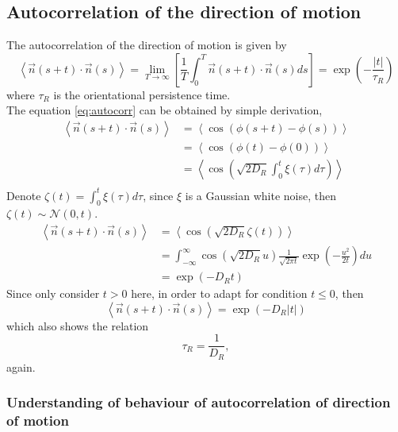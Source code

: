 \documentclass[runningheads]{llncs}
\begin{document}
\subsection{Autocorrelation of the direction of motion}
The autocorrelation of the direction of motion is given by
\begin{equation}
    \label{eq:autocorr}
    \left\langle\vec{n}(s+t)\cdot\vec{n}(s)\right\rangle = \lim_{T\to\infty}\left[\frac1T\int_0^T\vec{n}(s+t)\cdot\vec{n}(s)ds\right]=\exp\left(-\frac{\left\lvert t\right\rvert }{\tau_R}\right)
\end{equation}
where $\tau_R$ is  the  orientational  persistence  time.\\
The equation \eqref{eq:autocorr} can be obtained by simple derivation,
$$
    \begin{aligned}
        \left\langle \vec{n}(s+t)\cdot\vec{n}(s)\right\rangle
         & =\left\langle\cos(\phi(s+t)-\phi(s))\right\rangle                            \\
         & =\left\langle\cos(\phi(t)-\phi(0))\right\rangle                              \\
         & =\left\langle\cos\left(\sqrt{2D_R}\int_0^t\xi(\tau)d\tau\right)\right\rangle \\
    \end{aligned}
$$
Denote $\zeta(t)=\int_0^t\xi(\tau)d\tau$, since $\xi$ is a Gaussian white noise, then $\zeta(t)\sim \mathcal{N}(0,t)$.
$$
    \begin{aligned}
        \left\langle \vec{n}(s+t)\cdot\vec{n}(s)\right\rangle
         & =\left\langle\cos\left(\sqrt{2D_R}\zeta(t)\right)\right\rangle                                               \\
         & =\int_{-\infty}^{\infty}\cos\left(\sqrt{2D_R}u\right)\frac1{\sqrt{2\pi t}}\exp\left(-\frac{u^2}{2t}\right)du \\
         & =\exp\left(-D_R t\right)
    \end{aligned}
$$
Since only consider $t>0$ here, in order to adapt for condition $t\leq 0$, then
$$
    \left\langle \vec{n}(s+t)\cdot\vec{n}(s)\right\rangle=\exp\left(-D_R \left\lvert t\right\rvert\right)
$$
which also shows the relation 
\begin{equation}
    \label{eq:depD}
    \tau_R=\frac1{D_R},
\end{equation}
again.

\subsubsection{Understanding of behaviour of autocorrelation of direction of motion}
\hfill\break
\end{document}
